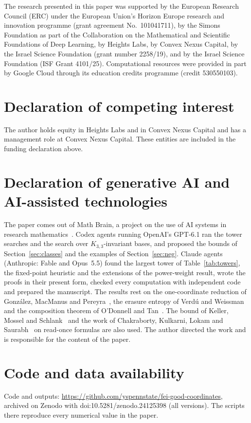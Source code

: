 \documentclass[11pt]{amsart}
\theoremstyle{definition}
\theoremstyle{remark}
\begin{document}
The research presented in this paper was supported by the European Research Council (ERC) under the European Union's
Horizon Europe research and innovation programme (grant agreement No.~101041711), by the Simons Foundation as part of
the Collaboration on the Mathematical and Scientific Foundations of Deep Learning, by Heights Labs, by Convex Nexus
Capital, by the Israel Science Foundation (grant number 2258/19), and by the Israel Science Foundation (ISF Grant
4101/25). Computational resources were provided in part by Google Cloud through its education credits programme (credit
530550103).

\section*{Declaration of competing interest}
The author holds equity in Heights Labs and in Convex Nexus Capital and has a management role at Convex Nexus Capital.
These entities are included in the funding declaration above.

\section*{Declaration of generative AI and AI-assisted technologies}
The paper comes out of Math Brain, a project on the use of AI systems in research
mathematics~\cite{BrainFramework,MathBrainRepo}. Codex agents running OpenAI's GPT-6.1 ran the tower searches and the
search over $K_{3,3}$-invariant bases, and proposed the bounds of Section~\ref{sec:classes} and the examples of
Section~\ref{sec:neg}. Claude agents (Anthropic: Fable and Opus~5.5) found the largest tower of
Table~\ref{tab:towers}, the fixed-point heuristic and the extensions of the power-weight result, wrote the proofs in
their present form, checked every computation with independent code and prepared the manuscript. The results rest on
the one-coordinate reduction of Gonz\'alez, MacManus and Pereyra~\cite{GMP}, the erasure entropy of Verd\'u and
Weissman~\cite{VW08} and the composition theorem of O'Donnell and Tan~\cite{OT13}. The bound of Keller, Mossel and
Schlank~\cite{KMS} and the work of Chakraborty, Kulkarni, Lokam and Saurabh~\cite{CKLS} on read-once formulas are
also used. The author directed the
work and is responsible for the content of the paper.

\section*{Code and data availability}
Code and outputs: \url{https://github.com/yspennstate/fei-good-coordinates}, archived on Zenodo with doi:10.5281/zenodo.24125398 (all versions). The scripts there reproduce every numerical
value in the paper.
\end{document}
